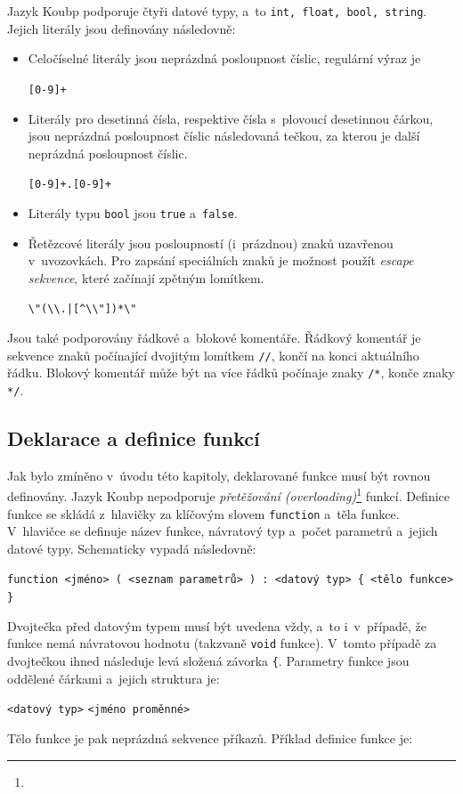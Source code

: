 Jazyk Koubp podporuje čtyři datové typy, a~to \texttt{int, float, bool, string}.
Jejich literály jsou definovány následovně:
\begin{itemize}
    \item Celočíselné literály jsou neprázdná posloupnost číslic, regulární výraz je
    \begin{center}
        \texttt{[0-9]+}
    \end{center} 
    \item Literály pro desetinná čísla, respektive čísla s~plovoucí desetinnou čárkou, jsou neprázdná posloupnost číslic následovaná tečkou, za kterou je další neprázdná posloupnost číslic.
    \begin{center}
        \texttt{[0-9]+.[0-9]+}
    \end{center}
    \item Literály typu \texttt{bool} jsou \texttt{true} a~\texttt{false}.
    \item Řetězcové literály jsou posloupností (i~prázdnou) znaků uzavřenou v~uvozovkách.
    Pro zapsání speciálních znaků je možnost použít \emph{escape sekvence}, které začínají zpětným lomítkem.
    \begin{center}
        \texttt{\textbackslash"(\textbackslash\textbackslash.|[\^{}\textbackslash\textbackslash"])*\textbackslash"}
    \end{center}
\end{itemize}

Jsou také podporovány řádkové a~blokové komentáře.
Řádkový komentář je sekvence znaků počínající dvojitým lomítkem \texttt{//}, končí na konci aktuálního řádku.
Blokový komentář může být na více řádků počínaje znaky \texttt{/*}, konče znaky \texttt{*/}.

\subsection*{Deklarace a definice funkcí}
Jak bylo zmíněno v~úvodu této kapitoly, deklarované funkce musí být rovnou definovány.
Jazyk Koubp nepodporuje \emph{přetěžování (overloading)}\footnote{} funkcí.
Definice funkce se skládá z~hlavičky za klíčovým slovem \texttt{function} a~těla funkce.
V~hlavičce se definuje název funkce, návratový typ a~počet parametrů a~jejich datové typy.
Schematicky vypadá následovně:
\begin{center}
    \texttt{function <jméno> ( <seznam parametrů> ) : <datový typ> \{ <tělo funkce> \}}
\end{center}
Dvojtečka před datovým typem musí být uvedena vždy, a~to i~v~případě, že funkce nemá návratovou hodnotu (takzvaně \texttt{void} funkce).
V~tomto případě za dvojtečkou ihned následuje levá složená závorka \texttt{\{}.
Parametry funkce jsou oddělené čárkami a~jejich struktura je:
\begin{center}
     \texttt{<datový typ>} \texttt{<jméno proměnné>}
\end{center}
Tělo funkce je pak neprázdná sekvence příkazů.
Příklad definice funkce je:
\begin{center}
\end{center}

